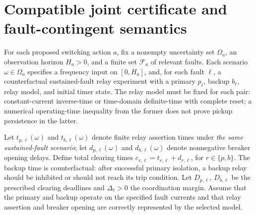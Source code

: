 \section{Compatible joint certificate and fault-contingent semantics}
\label{sec:joint-rigorous}
For each proposed switching action \(a\), fix a nonempty uncertainty set \(\Omega_a\), an observation horizon \(H_a>0\), and a finite set \(\mathcal F_a\) of relevant faults. Each scenario \(\omega\in\Omega_a\) specifies a frequency input on \([0,H_a]\), and, for each fault \(\ell\), a counterfactual sustained-fault relay experiment with a primary \(p_\ell\), backup \(b_\ell\), relay model, and initial timer state. The relay model must be fixed for each pair: constant-current inverse-time or time-domain definite-time with complete reset; a numerical operating-time inequality from the former does not prove pickup persistence in the latter.

Let \(t_{p,\ell}(\omega)\) and \(t_{b,\ell}(\omega)\) denote finite relay assertion times under \emph{the same sustained-fault scenario}; let \(d_{p,\ell}(\omega)\) and \(d_{b,\ell}(\omega)\) denote nonnegative breaker opening delays. Define total clearing times \(c_{r,\ell}=t_{r,\ell}+d_{r,\ell}\), for \(r\in\{p,b\}\). The backup time is counterfactual: after successful primary isolation, a backup relay should be inhibited or should not reach its trip condition. Let \(D_{p,\ell}\), \(D_{b,\ell}\) be the prescribed clearing deadlines and \(\Delta_\ell>0\) the coordination margin. Assume that the primary and backup operate on the specified fault currents and that relay assertion and breaker opening are correctly represented by the selected model.

